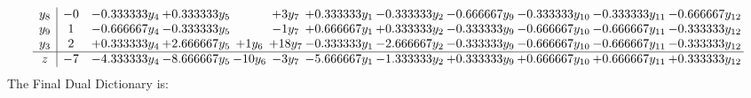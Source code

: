 \documentclass[11pt]{article}
\begin{document}
\[\begin{array}{c| c c@{\hskip 2pt} c@{\hskip 2pt} c@{\hskip 2pt} c@{\hskip 2pt} c@{\hskip 2pt} c@{\hskip 2pt} c@{\hskip 2pt} c@{\hskip 2pt} c@{\hskip 2pt} c@{\hskip 2pt} }
 y_{8}   &  -0 & -0.333333 y_{4} & + 0.333333 y_{5} &   & + 3 y_{7} & + 0.333333 y_{1} & -0.333333 y_{2} & -0.666667 y_{9} & -0.333333 y_{10} & -0.333333 y_{11} & -0.666667 y_{12}\\
 y_{9}   &  1 & -0.666667 y_{4} & -0.333333 y_{5} &   & -1 y_{7} & + 0.666667 y_{1} & + 0.333333 y_{2} & -0.333333 y_{9} & -0.666667 y_{10} & -0.666667 y_{11} & -0.333333 y_{12}\\
 y_{3}   &  2 & + 0.333333 y_{4} & + 2.666667 y_{5} & + 1 y_{6} & + 18 y_{7} & -0.333333 y_{1} & -2.666667 y_{2} & -0.333333 y_{9} & -0.666667 y_{10} & -0.666667 y_{11} & -0.333333 y_{12}\\
\hline
z    &  -7 & -4.333333 y_{4} & -8.666667 y_{5} & -10 y_{6} & -3 y_{7} & -5.666667 y_{1} & -1.333333 y_{2} & + 0.333333 y_{9} & + 0.666667 y_{10} & + 0.666667 y_{11} & + 0.333333 y_{12}\\
\end{array}\]
The Final Dual Dictionary is: 
\end{document}
